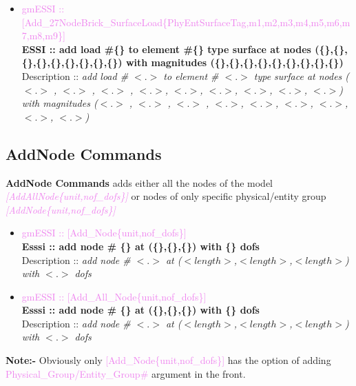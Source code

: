 \documentclass[11pt]{article}
\begin{document}
\begin{itemize}
    \item \textcolor{violet} {gmESSI :: [Add\_27NodeBrick\_SurfaceLoad\{PhyEntSurfaceTag,m1,m2,m3,m4,m5,m6,m7,m8,m9\}]}\\  
    \textbf{ESSI :: add load \#\{\} to element \#\{\} type surface at nodes (\{\},\{\},\{\},\{\},\{\},\{\},\{\},\{\},\{\}) with magnitudes (\{\},\{\},\{\},\{\},\{\},\{\},\{\},\{\},\{\})}\\
    Description :: \textit{add load \# $<.>$ to element \# $<.>$ type surface at nodes ($<.>$ , $<.>$ , $<.>$ , $<.>$, $<.>$, $<.>$, $<.>$, $<.>$, $<.>$) with magnitudes ($<.>$ , $<.>$ , $<.>$ , $<.>$, $<.>$, $<.>$, $<.>$, $<.>$, $<.>$)}

  \end{itemize}

\subsection{AddNode Commands}


\textbf{AddNode Commands} adds either all the nodes of the model \textit{\textcolor{violet}{[AddAllNode\{unit,nof\_dofs\}]}} or nodes of only specific physical/entity group \textit{\textcolor{violet}{[AddNode\{unit,nof\_dofs\}]}}

  \begin{itemize}

    \item \textcolor{violet}{gmESSI :: [Add\_Node\{unit,nof\_dofs\}]} \\             
    \textbf{Esssi :: add node \# \{\} at (\{\},\{\},\{\}) with \{\} dofs} \\
    Description :: \textit{add node \# $<.>$ at ($<length>$,$<length>$,$<length>$)  with $<.>$ dofs}

    \item \textcolor{violet}{gmESSI :: [Add\_All\_Node\{unit,nof\_dofs\}]} \\             
    \textbf{Esssi :: add node \# \{\} at (\{\},\{\},\{\}) with \{\} dofs}\\
    Description :: \textit{add node \# $<.>$ at ($<length>$,$<length>$,$<length>$)  with $<.>$ dofs}

  \end{itemize}

\noindent \textbf{Note:-} Obviously only \textcolor{violet}{[Add\_Node\{unit,nof\_dofs\}]} has the option of adding \textcolor{violet}{Physical\_Group/Entity\_Group\#} argument in the front.
\end{document}
